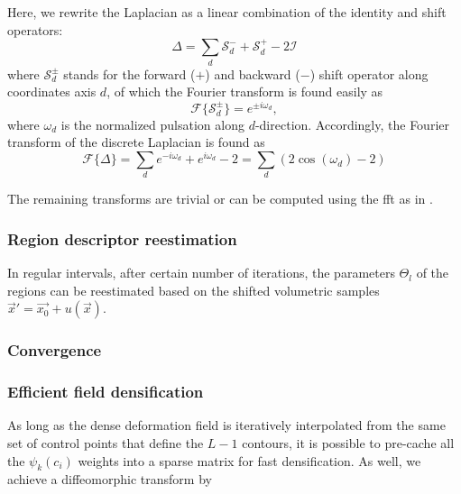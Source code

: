 Here, we rewrite the Laplacian as a linear combination of the identity and shift operators:
\begin{equation}
\Delta = \sum\limits_d \mathcal{S}_d^- + \mathcal{S}_d^+ - 2 \mathcal{I}
\end{equation}
where $\mathcal{S}_{d}^{\pm}$ stands for the forward ($+$) and backward ($-$) shift 
operator along coordinates axis $d$, of which the Fourier transform is found easily as
\begin{equation}
\mathcal{F}\{\mathcal{S}_{d}^{\pm}\} = e^{\pm i\omega_{d}},
\end{equation}
where $\omega_{d}$ is the normalized pulsation along $d$-direction. Accordingly, the 
Fourier transform of the discrete Laplacian is found as
\begin{equation}
\mathcal{F}\{\Delta\} = \sum\limits_d e^{-i\omega_d } + e^{i\omega_d } - 2 = \sum\limits_d \left( 2\cos(\omega_d) - 2 \right)
\end{equation}

The remaining transforms are trivial or can be computed using the \gls{fft} 
as in \citep{estellers_efficient_2011}.

\subsubsection{Region descriptor reestimation}
In regular intervals, after certain number of iterations,
the parameters $\Theta_l$ of the regions can be reestimated 
based on the shifted volumetric samples 
$\vec{x}' = \vec{x_0} + u(\vec{x})$.

\subsubsection{Convergence}

\subsubsection{Efficient field densification}
As long as the dense deformation field is iteratively interpolated
from the same set of control points that define the $L-1$ contours,
it is possible to pre-cache all the $\psi_k(c_i)$ weights into a
sparse matrix for fast densification. As well, we achieve a 
diffeomorphic transform by
